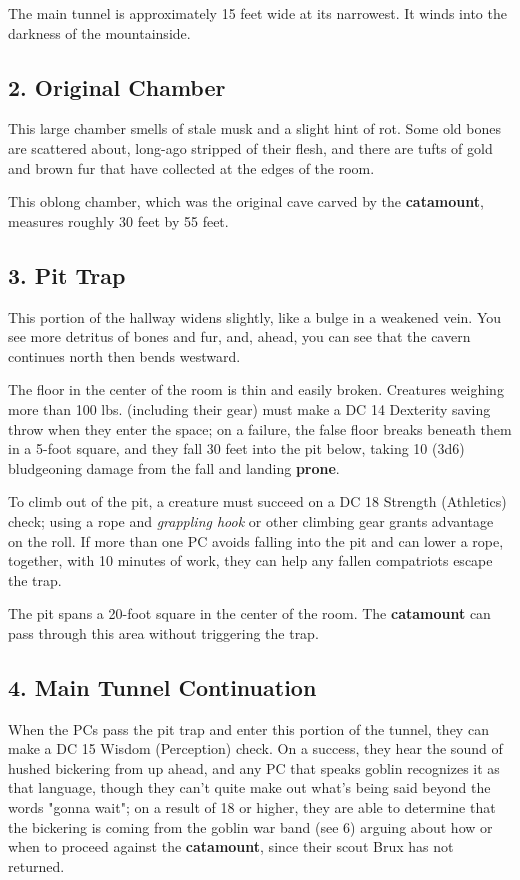 \documentclass[10pt,a4paper,twoside,bg=print,twocolumn,openany,nodeprecatedcode]{dndbook}
\begin{document}
The main tunnel is approximately 15 feet wide at its narrowest. It winds into the darkness of the mountainside.

\subsection{2. Original Chamber}
\begin{DndReadAloud}{}
This large chamber smells of stale musk and a slight hint of rot. Some old bones are scattered about, long-ago stripped of their flesh, and there are tufts of gold and brown fur that have collected at the edges of the room.

\end{DndReadAloud}

This oblong chamber, which was the original cave carved by the \textbf{catamount}, measures roughly 30 feet by 55 feet.

\subsection{3. Pit Trap}
\begin{DndReadAloud}{}
This portion of the hallway widens slightly, like a bulge in a weakened vein. You see more detritus of bones and fur, and, ahead, you can see that the cavern continues north then bends westward.

\end{DndReadAloud}

The floor in the center of the room is thin and easily broken. Creatures weighing more than 100 lbs. (including their gear) must make a DC 14 Dexterity saving throw when they enter the space; on a failure, the false floor breaks beneath them in a 5-foot square, and they fall 30 feet into the pit below, taking 10 (3d6) bludgeoning damage from the fall and landing \textbf{prone}.

To climb out of the pit, a creature must succeed on a DC 18 Strength (Athletics) check; using a rope and \textit{grappling hook} or other climbing gear grants advantage on the roll. If more than one PC avoids falling into the pit and can lower a rope, together, with 10 minutes of work, they can help any fallen compatriots escape the trap.

The pit spans a 20-foot square in the center of the room. The \textbf{catamount} can pass through this area without triggering the trap.

\subsection{4. Main Tunnel Continuation}
When the PCs pass the pit trap and enter this portion of the tunnel, they can make a DC 15 Wisdom (Perception) check. On a success, they hear the sound of hushed bickering from up ahead, and any PC that speaks goblin recognizes it as that language, though they can't quite make out what's being said beyond the words "gonna wait"; on a result of 18 or higher, they are able to determine that the bickering is coming from the goblin war band (see 6) arguing about how or when to proceed against the \textbf{catamount}, since their scout Brux has not returned.
\end{document}
